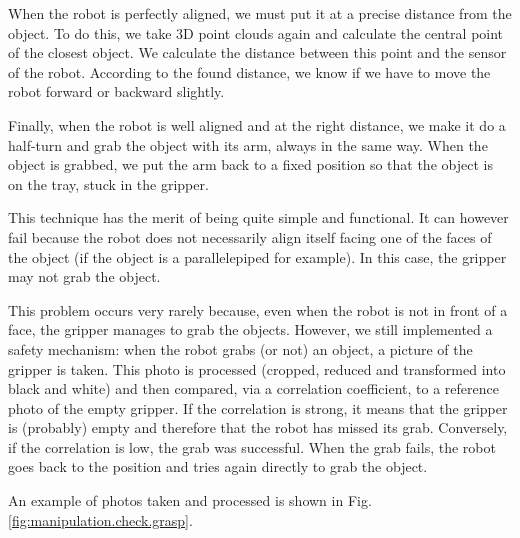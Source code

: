 \documentclass[a4paper, 10pt, conference]{ieeeconf}
\begin{document}
    When the robot is perfectly aligned, we must put it at a precise distance from the object. To do this, we take 3D point clouds again and calculate the central point of the closest object. We calculate the distance between this point and the sensor of the robot. According to the found distance, we know if we have to move the robot forward or backward slightly.
    
    Finally, when the robot is well aligned and at the right distance, we make it do a half-turn and grab the object with its arm, always in the same way. When the object is grabbed, we put the arm back to a fixed position so that the object is on the tray, stuck in the gripper.
    
    This technique has the merit of being quite simple and functional. It can however fail because the robot does not necessarily align itself facing one of the faces of the object (if the object is a parallelepiped for example). In this case, the gripper may not grab the object.
    
    This problem occurs very rarely because, even when the robot is not in front of a face, the gripper manages to grab the objects. However, we still implemented a safety mechanism: when the robot grabs (or not) an object, a picture of the gripper is taken. This photo is processed (cropped, reduced and transformed into black and white) and then compared, via a correlation coefficient, to a reference photo of the empty gripper. If the correlation is strong, it means that the gripper is (probably) empty and therefore that the robot has missed its grab. Conversely, if the correlation is low, the grab was successful. When the grab fails, the robot goes back to the position and tries again directly to grab the object.
    
    An example of photos taken and processed is shown in Fig. \ref{fig:manipulation.check.grasp}.
    
\end{document}
